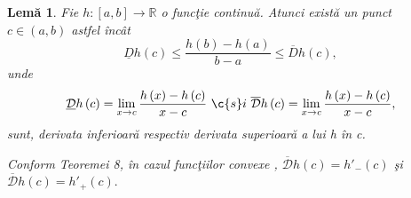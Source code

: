 \documentclass[a4paper,12pt,oneside]{report}
\newtheorem{lemma}{Lem\u{a}}
\begin{document}
\begin{lemma}
Fie \(h : \left [ a,b\right ]\rightarrow \mathbb{R}\) o func\c{t}ie continu\u{a}. Atunci exist\u{a} un punct \(c \in \left ( a,b \right )\) astfel \^{i}nc\^{a}t
\begin{displaymath}
   \underline{D}h\left ( c \right ) \leq  \frac{h\left ( b \right ) - h\left ( a \right )}{b-a}\leq \overline{D}h\left ( c \right ),
\end{displaymath}
unde
\begin{displaymath}
   \underline{\mathcal{D}}h\left ( c \right ) = \lim_{x\rightarrow c}  \frac{h\left ( x \right ) - h\left ( c \right )}{x-c} ~\c{s}i ~ \overline{\mathcal{D}}h\left ( c \right ) = \lim_{x\rightarrow c}  \frac{h\left ( x \right ) - h\left ( c \right )}{x-c},
\end{displaymath}
sunt, derivata inferioar\u{a} respectiv derivata superioar\u{a} a lui h \^{i}n c. 

Conform Teoremei 8, \^{i}n cazul func\c{t}iilor convexe , \(\overline{\mathcal{D}}h\left ( c \right ) = {h}'_{-}\left ( c \right )\)  \c{s}i   \(\overline{\mathcal{D}}h\left ( c \right )  = {h}'_{+}\left ( c \right ).\)
\end{lemma}
\end{document}
